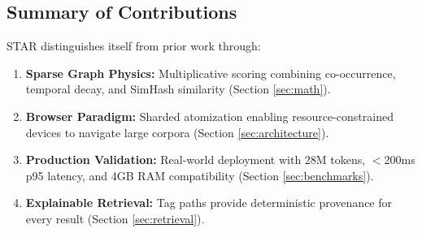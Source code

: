 \subsection{Summary of Contributions}

STAR distinguishes itself from prior work through:
\begin{enumerate}
    \item \textbf{Sparse Graph Physics:} Multiplicative scoring combining co-occurrence, temporal decay, and SimHash similarity (Section \ref{sec:math}).
    \item \textbf{Browser Paradigm:} Sharded atomization enabling resource-constrained devices to navigate large corpora (Section \ref{sec:architecture}).
    \item \textbf{Production Validation:} Real-world deployment with 28M tokens, $<$200ms p95 latency, and 4GB RAM compatibility (Section \ref{sec:benchmarks}).
    \item \textbf{Explainable Retrieval:} Tag paths provide deterministic provenance for every result (Section \ref{sec:retrieval}).
\end{enumerate}